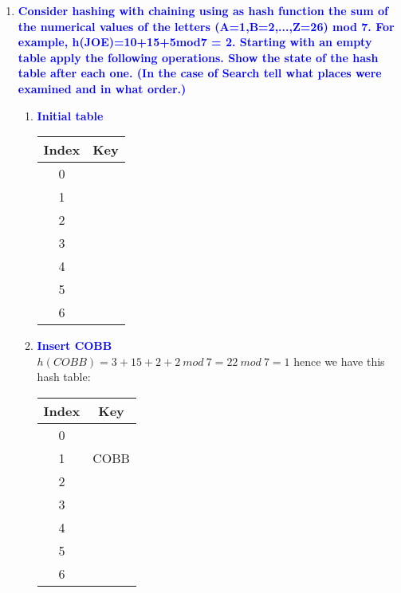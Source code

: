 \documentclass[11pt]{article}
\begin{document}
\begin{enumerate}
\begin{enumerate}
    \end{enumerate}
\item \textbf{\textcolor{blue}{Consider hashing with chaining using as hash function 
the sum of the numerical values of the letters (A=1,B=2,...,Z=26) mod 7. 
For example, h(JOE)=10+15+5mod7 = 2.  Starting with an empty table apply the following 
operations. Show the state of the hash table after each one. (In the
case of Search tell what places were examined and in what order.)}}
    \begin{enumerate}
    \item \textbf{\textcolor{blue}{Initial table}}
        \begin{center}
        \begin{tabular}{ | c | c | } 
            \hline
            Index & Key \\ 
            \hline\hline
            0 & \\
            \hline
            1 & \\
            \hline
            2 & \\
            \hline
            3 & \\
            \hline
            4 & \\
            \hline
            5 & \\
            \hline
            6 & \\
            \hline
        \end{tabular}
        \end{center}
    \item \textbf{\textcolor{blue}{Insert COBB}}
        \\ $h(COBB)=3+15+2+2\ mod\ 7 = 22\ mod\ 7 = 1$ hence we have this hash table:
        \begin{center}
        \begin{tabular}{ | c | c | } 
            \hline
            Index & Key \\ 
            \hline\hline
            0 & \\
            \hline
            1 & COBB\\
            \hline
            2 & \\
            \hline
            3 & \\
            \hline
            4 & \\
            \hline
            5 & \\
            \hline
            6 & \\
            \hline
        \end{tabular}

\end{center}
\end{enumerate}
\end{enumerate}
\end{document}
